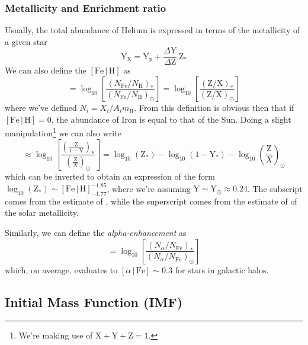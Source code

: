 \subsubsection*{Metallicity and Enrichment ratio}
Usually, the total abundance of Helium is expressed in terms of the metallicity of a given star 
\begin{equation}
	\text{Y}_{\text{X}} = \text{Y}_{\text{p}} + \frac{\Delta \text{Y}}{\Delta \text{Z}} \, \text{Z}_{*}
	\label{eq:he-metal_enratio}
\end{equation}
We can also define the $[\text{Fe}\,|\,\text{H}]$ as 
\begin{equation}
	[\text{Fe}\,|\,\text{H}] = \log_{10}\left[\frac{(N_{\text{Fe}}/N_{\text{H}})_{*}}{(N_{\text{Fe}}/N_{\text{H}})_{\odot}}\right] = \log_{10}\left[\frac{(\text{Z}/\text{X})_{*}}{(\text{Z}/\text{X})_{\odot}}\right]
	\label{eq:fe/h}
\end{equation}
where we've defined $N_{i} = X_{i}/A_{i}m_{\text{H}}$. From this definition is obvious then that if $[\text{Fe}\,|\,\text{H}] = 0$, the abundance of Iron is equal to that of the Sun. Doing a slight manipulation\footnote{We're making use of $\text{X}+\text{Y}+\text{Z} = 1$.} we can also write
\begin{equation}
	[\text{Fe}\,|\,\text{H}] \approx \log_{10}\left[\frac{(\frac{\text{Z}}{1-\text{Y}})_{*}}{(\frac{\text{Z}}{X})_{\odot}}\right] = \log_{10}(\text{Z}_{*})-\log_{10}(1-\text{Y}_{*}) - \log_{10}\left(\frac{\text{Z}}{X}\right)_{\odot}
	\label{fe/h_metallicity}
\end{equation}
which can be inverted to obtain an expression of the form $\log_{10}(\text{Z}_{*}) \sim [\text{Fe}\,|\,\text{H}]^{-1.85}_{-1.77}$, where we're assuming $\text{Y}\sim\text{Y}_{\odot}\approx 0.24$. The subscript comes from the estimate of \cite{2022A&A...661A.140M}, while the superscript comes from the estimate of \cite{2021A&A...653A.141A} of the solar metallicity.
\par Similarly, we can define the \emph{alpha-enhancement} as 
\begin{equation}
	[\alpha\,|\,\text{Fe}] = \log_{10}\left[\frac{(N_{\alpha}/N_{\text{Fe}})_{*}}{(N_{\alpha}/N_{\text{Fe}})_{\odot}}\right]
\end{equation}
which, on average, evaluates to $[\alpha\,|\,\text{Fe}] \sim 0.3$ for stars in galactic halos.

\subsection{Initial Mass Function (IMF)}

